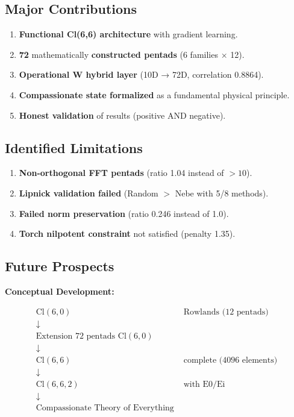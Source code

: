 \documentclass[11pt]{article}
\providecommand{\tightlist}{%
\setlength{\itemsep}{2pt}\setlength{\parskip}{6pt}
}
\begin{document}
\hypertarget{major-contributions}{%
\subsection{Major Contributions}\label{major-contributions}}

\begin{enumerate}
\def\labelenumi{\arabic{enumi}.}
\tightlist
\item
  \textbf{Functional Cl(6,6) architecture} with gradient learning.
\item
  \textbf{72} mathematically \textbf{constructed pentads} (6 families ×
  12).
\item
  \textbf{Operational W hybrid layer} (10D → 72D, correlation 0.8864).
\item
  \textbf{Compassionate state formalized} as a fundamental physical
  principle.
\item
  \textbf{Honest validation} of results (positive AND negative).
\end{enumerate}

\hypertarget{identified-limitations}{%
\subsection{Identified Limitations}\label{identified-limitations}}

\begin{enumerate}
\def\labelenumi{\arabic{enumi}.}
\tightlist
\item
  \textbf{Non-orthogonal FFT pentads} (ratio 1.04 instead of \(>10\)).
\item
  \textbf{Lipnick validation failed} (Random \(>\) Nebe with 5/8
  methods).
\item
  \textbf{Failed norm preservation} (ratio 0.246 instead of 1.0).
\item
  \textbf{Torch nilpotent constraint} not satisfied (penalty 1.35).
\end{enumerate}

\hypertarget{future-prospects}{%
\subsection{Future Prospects}\label{future-prospects}}

\textbf{Conceptual Development:}

\begin{align*}
\text{Cl}(6,0) &\text{ Rowlands (12 pentads)} \\
\downarrow \\
\text{Extension 72 pentads Cl}(6,0) \\
\downarrow \\
\text{Cl}(6,6) &\text{ complete (4096 elements)} \\
\downarrow \\
\text{Cl}(6,6,2) &\text{ with E0/Ei} \\
\downarrow \\
\text{Compassionate Theory of Everything}
\end{align*}
\end{document}
